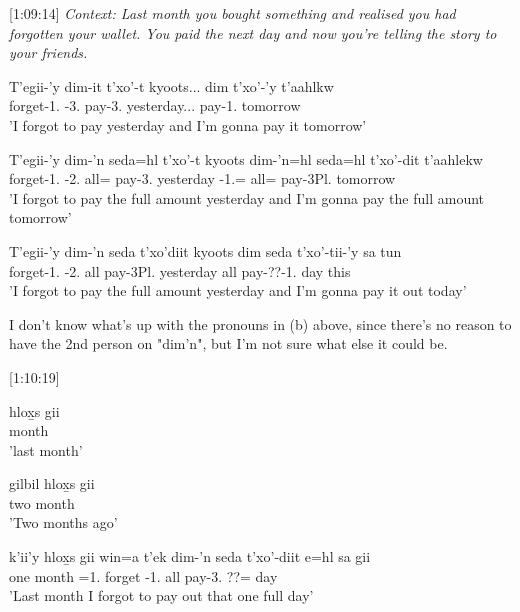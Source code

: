 [1:09:14] \textit{Context: Last month you bought something and realised you had forgotten your wallet. You paid the next day and now you're telling the story to your friends.}
\begin{exe}
\ex \begin{xlist}
\item \gll T'egii-'y dim-it t'xo'-t kyoots... dim t'xo'-'y t'aahlkw\\
forget-1.\Ii{} \Fut{}-3.\Ii{} pay-3.\Ii{} yesterday... \Fut{} pay-1.\Ii{} tomorrow\\
'I forgot to pay yesterday and I'm gonna pay it tomorrow'
\item \gll T'egii-'y dim-'n seda=hl t'xo'-t kyoots dim-'n=hl seda=hl t'xo'-dit t'aahlekw\\
forget-1.\Ii{} \Fut{}-2.\Ii{} all=\Cn{} pay-3.\Ii{} yesterday \Fut{}-1.\I{}=\Cn{} all=\Cn{} pay-3Pl.\I{} tomorrow\\
'I forgot to pay the full amount yesterday and I'm gonna pay the full amount tomorrow'
\item \gll T'egii-'y dim-'n seda t'xo'diit kyoots dim seda t'xo'-tii-'y sa tun\\
forget-1.\Ii{} \Fut{}-2.\Ii{} all pay-3Pl.\Ii{} yesterday \Fut{} all pay-??-1.\Ii{} day this\\
'I forgot to pay the full amount yesterday and I'm gonna pay it out today'
\end{xlist}
\end{exe}

I don't know what's up with the pronouns in (b) above, since there's no reason to have the 2nd person on "dim'n", but I'm not sure what else it could be.

[1:10:19]
\begin{exe}
\ex \begin{xlist}
\item \gll hlox̱s gii\\
month \Pst{}\\
'last month'
\item \gll gilbil hlox̱s gii \\
two month \Pst{}\\
'Two months ago'
\item \gll k'ii'y hlox̱s gii win=a t'ek dim-'n seda t'xo'-diit e=hl sa gii\\
one month \Pst{} \Comp{}=1.\I{} forget \Fut{}-1.\I{} all pay-3.\Ii{} ??=\Cn{} day \Pst{}\\
'Last month I forgot to pay out that one full day'
\end{xlist}
\end{exe}

